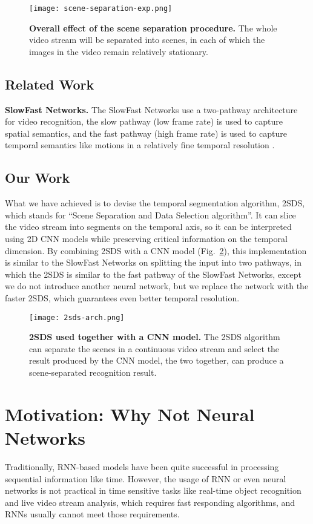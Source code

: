 \documentclass[
twocolumn,
]{ceurart}
\begin{document}
\begin{figure}
  \centering
  \texttt{[image: scene-separation-exp.png]}
  \caption{\textbf{Overall effect of the scene separation procedure.} The whole video stream will be separated into scenes, in each of which the images in the video remain relatively stationary.}\label{fig:scene}
\end{figure}


\subsection{Related Work}
\textbf{SlowFast Networks.} The SlowFast Networks use a two-pathway architecture for video recognition, the slow pathway (low frame rate) is used to capture spatial semantics, and the fast pathway (high frame rate) is used to capture temporal semantics like motions in a relatively fine temporal resolution \cite{DBLP:conf/iccv/Feichtenhofer0M19}.

\subsection{Our Work}
What we have achieved is to devise the temporal segmentation algorithm, 2SDS, which stands for “Scene Separation and Data Selection algorithm”. It can slice the video stream into segments on the temporal axis, so it can be interpreted using 2D CNN models while preserving critical information on the temporal dimension. By combining 2SDS with a CNN model (Fig.~\ref{fig:model}), this implementation is similar to the SlowFast Networks on splitting the input into two pathways, in which the 2SDS is similar to the fast pathway of the SlowFast Networks, except we do not introduce another neural network, but we replace the network with the faster 2SDS, which guarantees even better temporal resolution.

\begin{figure}
  \centering
  \texttt{[image: 2sds-arch.png]}
  \caption{\textbf{2SDS used together with a CNN model.} The 2SDS algorithm can separate the scenes in a continuous video stream and select the result produced by the CNN model, the two together, can produce a scene-separated recognition result.}\label{fig:model}
\end{figure}

\section{Motivation: Why Not Neural Networks}
Traditionally, RNN-based models have been quite successful in processing sequential information like time. However, the usage of RNN or even neural networks is not practical in time sensitive tasks like real-time object recognition and live video stream analysis, which requires fast responding algorithms, and RNNs usually cannot meet those requirements.
\end{document}
